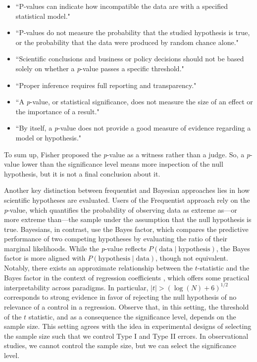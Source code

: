 \begin{itemize}
	\item ``P-values can indicate how incompatible the data are with a specified statistical model."
	\item ``P-values do not measure the probability that the studied hypothesis is true, or the probability that the data were produced by random chance alone."
	\item ``Scientific conclusions and business or policy decisions should not be based solely on whether a \textit{p}-value passes a specific threshold."
	\item ``Proper inference requires full reporting and transparency."
	\item ``A \textit{p}-value, or statistical significance, does not measure the size of an effect or the importance of a result."
	\item ``By itself, a \textit{p}-value does not provide a good measure of evidence regarding a model or hypothesis."
\end{itemize}

To sum up, Fisher proposed the \textit{p}-value as a witness rather than a judge. So, a \textit{p}-value lower than the significance level means more inspection of the null hypothesis, but it is not a final conclusion about it.

Another key distinction between frequentist and Bayesian approaches lies in how scientific hypotheses are evaluated. Users of the Frequentist approach rely on the \emph{p}-value, which quantifies the probability of observing data as extreme as—or more extreme than—the sample under the assumption that the null hypothesis is true. Bayesians, in contrast, use the Bayes factor, which compares the predictive performance of two competing hypotheses by evaluating the ratio of their marginal likelihoods. While the \emph{p}-value reflects \( P(\text{data} \mid \text{hypothesis}) \), the Bayes factor is more aligned with \( P(\text{hypothesis} \mid \text{data}) \), though not equivalent. Notably, there exists an approximate relationship between the \( t \)-statistic and the Bayes factor in the context of regression coefficients \cite{Raftery1995}, which offers some practical interpretability across paradigms. In particular, $|t|>(\log(N)+6)^{1/2}$ corresponds to strong evidence in favor of rejecting the null hypothesis of no relevance of a control in a regression. Observe that, in this setting, the threshold of the $t$ statistic, and as a consequence the significance level, depends on the sample size. This setting agrees with the idea in experimental designs of selecting the sample size such that we control Type I and Type II errors. In observational studies, we cannot control the sample size, but we can select the significance level.

